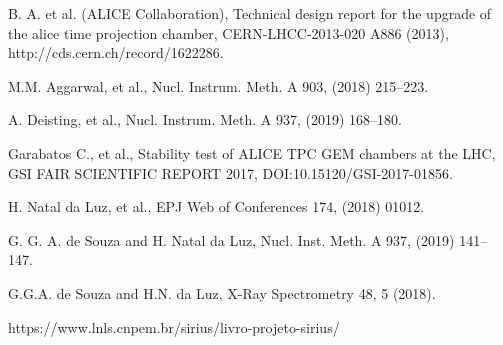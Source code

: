 \documentclass{report}
\begin{document}
\begin{thebibliography}{9}
 B. A. et al. (ALICE Collaboration), Technical design report for the upgrade of the alice time projection chamber, CERN-LHCC-2013-020 A886 (2013), http://cds.cern.ch/record/1622286.


 M.M. Aggarwal, et al., Nucl. Instrum. Meth. A 903, (2018) 215–223. 

 A. Deisting, et al., Nucl. Instrum. Meth. A 937, (2019) 168–180.


 Garabatos C., et al., Stability test of ALICE TPC GEM chambers at the LHC, GSI FAIR SCIENTIFIC REPORT 2017, DOI:10.15120/GSI-2017-01856.


 H. Natal da Luz, et al., EPJ Web of Conferences 174, (2018) 01012.



 G. G. A. de Souza and  H. Natal da Luz, Nucl. Inst. Meth. A 937, (2019) 141–147.

 G.G.A. de Souza and H.N. da Luz, X-Ray Spectrometry 48, 5 (2018).

 https://www.lnls.cnpem.br/sirius/livro-projeto-sirius/

\end{thebibliography}
\newpage
\newpage
\end{document}
